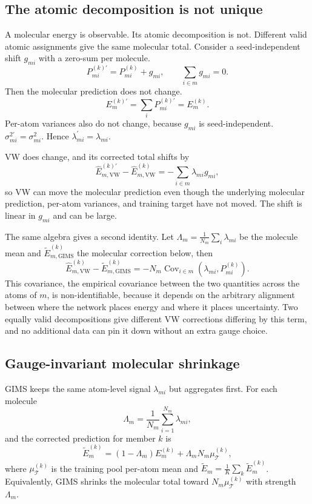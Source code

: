\documentclass{article}
\begin{document}
\subsection{The atomic decomposition is not unique}

A molecular energy is observable. Its atomic decomposition is not. Different
valid atomic assignments give the same molecular total. Consider a
seed-independent shift $g_{mi}$ with a zero-sum per molecule.
\[
P_{mi}^{(k)\prime} = P_{mi}^{(k)} + g_{mi}, \qquad \sum_{i\in m} g_{mi}=0 .
\]
Then the molecular prediction does not change.
\[
E_m^{(k)\prime}=\sum_i P_{mi}^{(k)\prime}=E_m^{(k)} .
\]
Per-atom variances also do not change, because $g_{mi}$ is seed-independent.
$\sigma_{mi}^{2\prime}=\sigma_{mi}^2$. Hence $\lambda_{mi}^\prime=\lambda_{mi}$.

VW does change, and its corrected total shifts by
\[
\hat{E}_{m,\mathrm{VW}}^{(k)\prime}-\hat{E}_{m,\mathrm{VW}}^{(k)}
= -\sum_{i\in m}\lambda_{mi} g_{mi} ,
\]
so VW can move the molecular prediction even though the underlying
molecular prediction, per-atom variances, and training target have not moved.
The shift is linear in $g_{mi}$ and can be large.

The same algebra gives a second identity. Let
$\Lambda_m=\frac1{N_m}\sum_i\lambda_{mi}$ be the molecule mean and
$\widetilde{E}_{m,\mathrm{GIMS}}^{(k)}$ the molecular correction below, then
\[
\hat{E}_{m,\mathrm{VW}}^{(k)} - \widetilde{E}_{m,\mathrm{GIMS}}^{(k)}
= -N_m \operatorname{Cov}_{i\in m}(\lambda_{mi},P_{mi}^{(k)}) .
\]
This covariance, the empirical covariance between the two quantities across
the atoms of $m$, is non-identifiable, because it depends on the arbitrary
alignment between where the network places energy and where it places
uncertainty. Two equally valid decompositions give different VW corrections
differing by this term, and no additional data can pin it down without an
extra gauge choice.

\subsection{Gauge-invariant molecular shrinkage}

GIMS keeps the same atom-level signal $\lambda_{mi}$ but aggregates first.
For each molecule
\[
\Lambda_m = \frac{1}{N_m}\sum_{i=1}^{N_m}\lambda_{mi} ,
\]
and the corrected prediction for member $k$ is
\[
\widetilde{E}_m^{(k)} = (1-\Lambda_m)E_m^{(k)} + \Lambda_m N_m \mu_{\mathcal T}^{(k)},
\]
where $\mu_{\mathcal T}^{(k)}$ is the training pool per-atom mean and
$\widetilde{E}_m=\frac1K\sum_k\widetilde{E}_m^{(k)}$. Equivalently, GIMS
shrinks the molecular total toward $N_m\mu_{\mathcal T}^{(k)}$ with strength
$\Lambda_m$.
\end{document}
